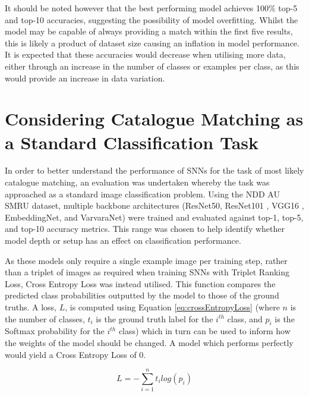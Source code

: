 It should be noted however that the best performing model achieves 100\% top-5 and top-10 accuracies, suggesting the possibility of model overfitting. Whilst the model may be capable of always providing a match within the first five results, this is likely a product of dataset size causing an inflation in model performance. It is expected that these accuracies would decrease when utilising more data, either through an increase in the number of classes or examples per class, as this would provide an increase in data variation.

\section{Considering Catalogue Matching as a Standard Classification Task}\label{ch:SNNEvaluation,sec:comparsion}

In order to better understand the performance of SNNs for the task of most likely catalogue matching, an evaluation was undertaken whereby the task was approached as a standard image classification problem. Using the NDD AU SMRU dataset, multiple backbone architectures (ResNet50, ResNet101 \cite{he_deep_2015}, VGG16 \cite{simonyan_very_2015}, EmbeddingNet, and VarvaraNet) were trained and evaluated against top-1, top-5, and top-10 accuracy metrics. This range was chosen to help identify whether model depth or setup has an effect on classification performance. 

As these models only require a single example image per training step, rather than a triplet of images as required when training SNNs with Triplet Ranking Loss, Cross Entropy Loss was instead utilised. This function compares the predicted class probabilities outputted by the model to those of the ground truths. A loss, $L$, is computed using Equation \ref{eq:crossEntropyLoss} (where $n$ is the number of classes, $t_{i}$ is the ground truth label for the $i^{th}$ class, and $p_{i}$ is the Softmax probability for the $i^{th}$ class) which in turn can be used to inform how the weights of the model should be changed. A model which performs perfectly would yield a Cross Entropy Loss of 0. 

\begin{equation}
	\label{eq:crossEntropyLoss}
	L = -\sum_{i=1}^{n} t_{i} log(p_{i})
\end{equation}

